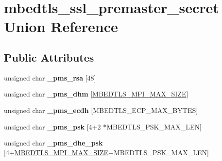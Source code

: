 \hypertarget{unionmbedtls__ssl__premaster__secret}{}\section{mbedtls\+\_\+ssl\+\_\+premaster\+\_\+secret Union Reference}
\label{unionmbedtls__ssl__premaster__secret}
\subsection*{Public Attributes}
\begin{DoxyCompactItemize}
\item 
\mbox{\label{unionmbedtls__ssl__premaster__secret_aa81cb4c88b891c552a5382460eb32f94}} 
unsigned char {\bfseries \+\_\+pms\+\_\+rsa} \mbox{[}48\mbox{]}
\item 
\mbox{\label{unionmbedtls__ssl__premaster__secret_a4d40cce21beb555ce7c4064bf330237c}} 
unsigned char {\bfseries \+\_\+pms\+\_\+dhm} \mbox{[}\mbox{\hyperlink{bignum_8h_a02bfffc46b7b2e10c0080d29bb56e6b0}{M\+B\+E\+D\+T\+L\+S\+\_\+\+M\+P\+I\+\_\+\+M\+A\+X\+\_\+\+S\+I\+ZE}}\mbox{]}
\item 
\mbox{\label{unionmbedtls__ssl__premaster__secret_af35264f678322dccd349d3486fa3645e}} 
unsigned char {\bfseries \+\_\+pms\+\_\+ecdh} \mbox{[}M\+B\+E\+D\+T\+L\+S\+\_\+\+E\+C\+P\+\_\+\+M\+A\+X\+\_\+\+B\+Y\+T\+ES\mbox{]}
\item 
\mbox{\label{unionmbedtls__ssl__premaster__secret_a61b5f1e012670e08b564867e2a5aa84b}} 
unsigned char {\bfseries \+\_\+pms\+\_\+psk} \mbox{[}4+2 $\ast$M\+B\+E\+D\+T\+L\+S\+\_\+\+P\+S\+K\+\_\+\+M\+A\+X\+\_\+\+L\+EN\mbox{]}
\item 
\mbox{\label{unionmbedtls__ssl__premaster__secret_ad3ec56031a020dfc72ca356eadb4cc9a}} 
unsigned char {\bfseries \+\_\+pms\+\_\+dhe\+\_\+psk} \mbox{[}4+\mbox{\hyperlink{bignum_8h_a02bfffc46b7b2e10c0080d29bb56e6b0}{M\+B\+E\+D\+T\+L\+S\+\_\+\+M\+P\+I\+\_\+\+M\+A\+X\+\_\+\+S\+I\+ZE}}+M\+B\+E\+D\+T\+L\+S\+\_\+\+P\+S\+K\+\_\+\+M\+A\+X\+\_\+\+L\+EN\mbox{]}
\item 

\end{DoxyCompactItemize}

